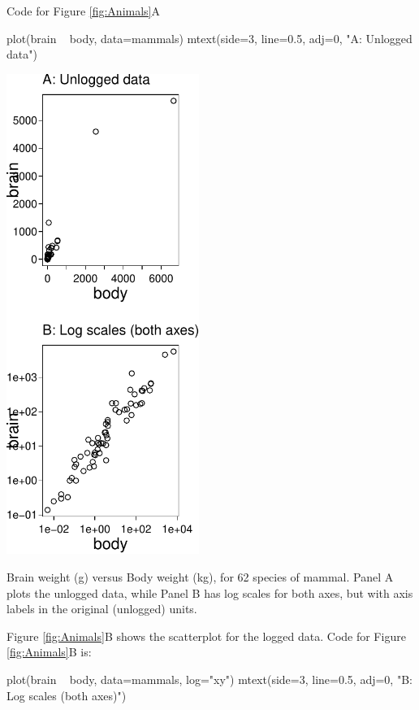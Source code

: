 \documentclass{tufte-book}\usepackage[]{graphicx}\usepackage[]{color}
\begin{document}
Code for Figure \ref{fig:Animals}A
\begin{Schunk}
\begin{Sinput}
plot(brain ~ body, data=mammals)
mtext(side=3, line=0.5, adj=0, "A: Unlogged data")
\end{Sinput}
\end{Schunk}

\begin{marginfigure}
\begin{Schunk}


\centerline{\includegraphics[width=0.47\textwidth]{figs/05-bbAB-1} }

\end{Schunk}
\caption{Brain weight (g) versus Body weight (kg), for 62 species of mammal.
Panel A plots the unlogged data, while Panel B has log scales for
both axes, but with axis labels in the original (unlogged) units.
  \label{fig:Animals}}
\end{marginfigure}

Figure \ref{fig:Animals}B shows the scatterplot for the logged data.
Code for Figure \ref{fig:Animals}B is:
\begin{Schunk}
\begin{Sinput}
plot(brain ~ body, data=mammals, log="xy")
mtext(side=3, line=0.5, adj=0,
      "B: Log scales (both axes)")
\end{Sinput}
\end{Schunk}
\end{document}
